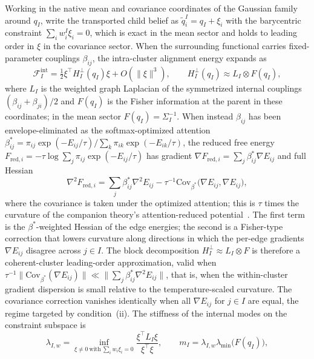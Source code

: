 Working in the native mean and covariance coordinates of the Gaussian family around $q_I$, write the transported child belief as $\widetilde{q}_i^I = q_I + \xi_i$ with the barycentric constraint $\sum_i w_i^I \xi_i = 0$, which is exact in the mean sector and holds to leading order in $\xi$ in the covariance sector. When the surrounding functional carries fixed-parameter couplings $\beta_{ij}$, the intra-cluster alignment energy expands as
\begin{equation}
\mathcal{F}_I^{\mathrm{int}} = \tfrac{1}{2}\xi^\top H_I^\perp(q_I)\xi + O(\|\xi\|^3), \qquad H_I^\perp(q_I) \approx L_I \otimes F(q_I),
\label{eq:rg_internal_hessian}
\end{equation}
where $L_I$ is the weighted graph Laplacian of the symmetrized internal couplings $(\beta_{ij} + \beta_{ji})/2$ and $F(q_I)$ is the Fisher information at the parent in these coordinates; in the mean sector $F(q_I)=\Sigma_I^{-1}$. When instead $\beta_{ij}$ has been envelope-eliminated as the softmax-optimized attention $\beta^*_{ij} = \pi_{ij} \exp(-E_{ij}/\tau) / \sum_k \pi_{ik} \exp(-E_{ik}/\tau)$, the reduced free energy $F_{\mathrm{red},i} = -\tau \log \sum_j \pi_{ij} \exp(-E_{ij}/\tau)$ has gradient $\nabla F_{\mathrm{red},i} = \sum_j \beta^*_{ij} \nabla E_{ij}$ and full Hessian
\begin{equation}
\nabla^2 F_{\mathrm{red},i} = \sum_j \beta^*_{ij} \nabla^2 E_{ij} - \tau^{-1} \mathrm{Cov}_{\beta^*}\big(\nabla E_{ij}, \nabla E_{ij}\big),
\label{eq:rg_reduced_hessian}
\end{equation}
where the covariance is taken under the optimized attention; this is $\tau$ times the curvature of the companion theory's attention-reduced potential~\cite[Ch.~6]{DennisGaugeVFE2026}. The first term is the $\beta^*$-weighted Hessian of the edge energies; the second is a Fisher-type correction that lowers curvature along directions in which the per-edge gradients $\nabla E_{ij}$ disagree across $j \in I$. The block decomposition $H_I^\perp \approx L_I \otimes F$ is therefore a coherent-cluster leading-order approximation, valid when $\tau^{-1}\|\mathrm{Cov}_{\beta^*}(\nabla E_{ij})\| \ll \|\sum_j \beta^*_{ij} \nabla^2 E_{ij}\|$, that is, when the within-cluster gradient dispersion is small relative to the temperature-scaled curvature. The covariance correction vanishes identically when all $\nabla E_{ij}$ for $j \in I$ are equal, the regime targeted by condition~(ii). The stiffness of the internal modes on the constraint subspace is
\begin{equation}
\lambda_{I,w} = \inf_{\xi \neq 0\ \text{with}\ \sum_i w_i \xi_i = 0} \frac{\xi^\top L_I \xi}{\xi^\top \xi}, \qquad m_I = \lambda_{I,w}\lambda_{\min}\big(F(q_I)\big),
\label{eq:rg_constrained_gap}
\end{equation}
